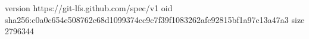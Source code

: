 version https://git-lfs.github.com/spec/v1
oid sha256:c0a0c654e508762c68d1099374cc9c7f39f1083262afc92815bf1a97c13a47a3
size 2796344
